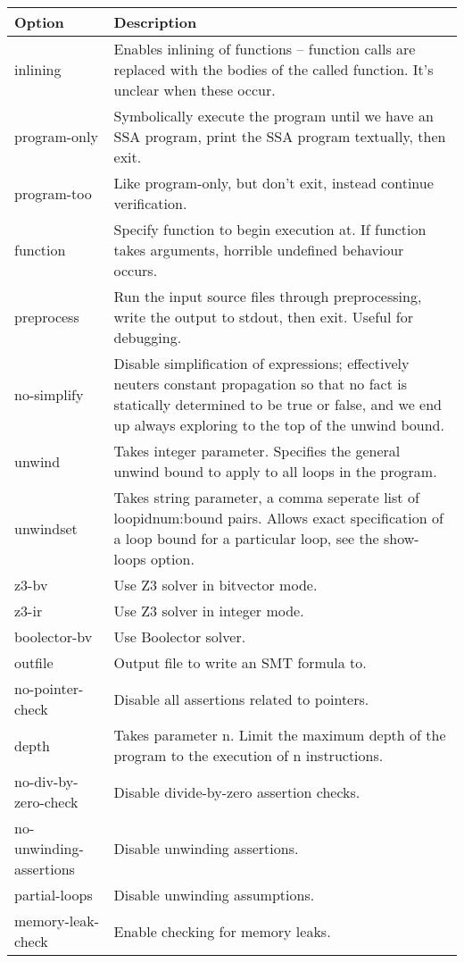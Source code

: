 \documentclass{article}
\begin{document}
\begin{longtable}{| p{} | p{} |}
\hline
Option & Description\\
\hline
inlining & Enables inlining of functions -- function calls are replaced with the
bodies of the called function. It's unclear when these occur.\\
\hline
program-only & Symbolically execute the program until we have an SSA program,
print the SSA program textually, then exit.\\
\hline
program-too & Like program-only, but don't exit, instead continue
verification.\\
\hline
function & Specify function to begin execution at. If function takes arguments,
horrible undefined behaviour occurs.\\
\hline
preprocess & Run the input source files through preprocessing, write the output
to stdout, then exit. Useful for debugging.\\
\hline
no-simplify & Disable simplification of expressions; effectively neuters
constant propagation so that no fact is statically determined to be true or
false, and we end up always exploring to the top of the unwind bound.\\
\hline
unwind & Takes integer parameter. Specifies the general unwind bound to apply
to all loops in the program.\\
\hline
unwindset & Takes string parameter, a comma seperate list of loopidnum:bound
pairs. Allows exact specification of a loop bound for a particular loop, see
the show-loops option.\\
\hline
z3-bv & Use Z3 solver in bitvector mode.\\
\hline
z3-ir & Use Z3 solver in integer mode.\\
\hline
boolector-bv & Use Boolector solver.\\
\hline
outfile & Output file to write an SMT formula to.\\
\hline
no-pointer-check & Disable all assertions related to pointers.\\
\hline
depth & Takes parameter n. Limit the maximum depth of the program to the
execution of n instructions.\\
\hline
no-div-by-zero-check & Disable divide-by-zero assertion checks.\\
\hline
no-unwinding-assertions & Disable unwinding assertions.\\
\hline
partial-loops & Disable unwinding assumptions.\\
\hline
memory-leak-check & Enable checking for memory leaks.\\

\end{longtable}
\end{document}
